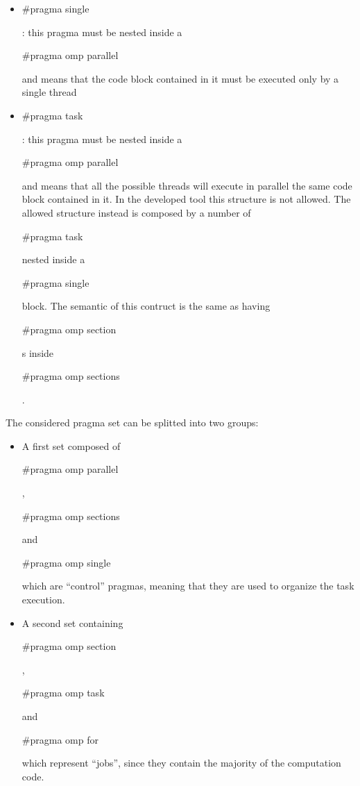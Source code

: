 \documentclass[a4paper,11pt,oneside]{book}
\begin{document}
\begin{itemize}
\item{\begin{bf}{$\#$pragma single}\end{bf} : this pragma must be nested inside a \begin{bf}{$\#$pragma omp parallel }\end{bf} and means that the code block contained in it must be executed only by a single thread}
\item{\begin{bf}{$\#$pragma task}\end{bf} : this pragma must be nested inside a \begin{bf}{$\#$pragma omp parallel }\end{bf} and means that all the possible threads will execute in parallel the same code block contained in it. In the developed tool this structure is not allowed. The allowed structure instead is composed by a number of \begin{bf}{$\#$pragma task}\end{bf} nested inside a \begin{bf}{$\#$pragma single}\end{bf} block. The semantic of this contruct is the same as  having \begin{bf}{$\#$pragma omp section}\end{bf}s inside \begin{bf}{$\#$pragma omp sections}\end{bf}.}
\end{itemize}

The considered pragma set can be splitted into two groups: 
\begin{itemize}
\item{ A first set composed of \begin{bf}{$\#$pragma omp parallel}\end{bf}, \begin{bf}{$\#$pragma omp sections}\end{bf} and \begin{bf}{ $\#$pragma omp single}\end{bf} which are “control” pragmas, meaning that they are used to organize the task execution.}
\item{A second set containing \begin{bf}{$\#$pragma omp section}\end{bf}, \begin{bf}{$\#$pragma omp task}\end{bf} and \begin{bf}{$\#$pragma omp for}\end{bf} which represent “jobs”, since they contain the majority of the computation code.}
\end{itemize}
\end{document}
